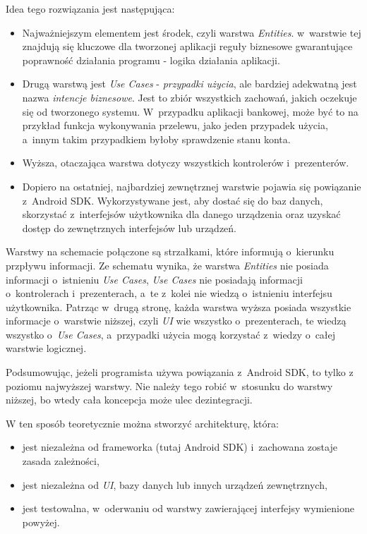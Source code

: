 Idea tego rozwiązania jest następująca:

\begin{itemize}

\item
Najważniejszym elementem jest środek, czyli warstwa \textit{Entities}. w~warstwie tej znajdują się kluczowe dla tworzonej aplikacji reguły biznesowe gwarantujące poprawność działania programu - logika działania aplikacji.
\item
Drugą warstwą jest \textit{Use Cases} - \textit{przypadki użycia}, ale bardziej adekwatną jest nazwa \textit{intencje biznesowe}. Jest to zbiór wszystkich zachowań, jakich oczekuje się od tworzonego systemu. W~przypadku aplikacji bankowej, może być to na przykład funkcja wykonywania przelewu, jako jeden przypadek użycia, a~innym takim przypadkiem byłoby sprawdzenie stanu konta.
\item
Wyższa, otaczająca warstwa dotyczy wszystkich kontrolerów i~prezenterów. 
\item
Dopiero na ostatniej, najbardziej zewnętrznej warstwie pojawia się powiązanie z~Android SDK. Wykorzystywane jest, aby dostać się do baz danych, skorzystać z~interfejsów użytkownika dla danego urządzenia oraz uzyskać dostęp do zewnętrznych interfejsów lub urządzeń.
\end{itemize}

Warstwy na schemacie połączone są strzałkami, które informują o~kierunku przpływu informacji. Ze schematu wynika, że warstwa \textit{Entities} nie posiada informacji o~istnieniu \textit{Use Cases}, \textit{Use Cases} nie posiadają informacji o~kontrolerach i~prezenterach, a~te z~kolei nie wiedzą o~istnieniu interfejsu użytkownika. Patrząc w~drugą stronę, każda warstwa wyższa posiada wszystkie informacje o~warstwie niższej, czyli \textit{UI} wie wszystko o~prezenterach, te wiedzą wszystko o~\textit{Use Cases}, a~przypadki użycia mogą korzystać z~wiedzy o~całej warstwie logicznej.

Podsumowując, jeżeli programista używa powiązania z~Android SDK, to tylko z poziomu najwyższej warstwy. Nie należy tego robić w~stosunku do warstwy niższej, bo wtedy cała koncepcja może ulec dezintegracji.

W ten sposób teoretycznie można stworzyć architekturę, która:
\begin{itemize}
\item
jest niezależna od frameworka (tutaj Android SDK) i~zachowana zostaje zasada zależności,
\item
jest niezależna od \textit{UI}, bazy danych lub innych urządzeń zewnętrznych,
\item
jest testowalna, w~oderwaniu od warstwy zawierającej interfejsy wymienione powyżej.
\end{itemize}

